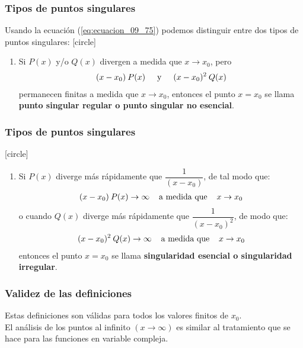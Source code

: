 \documentclass[12pt]{beamer}
\begin{document}
\begin{frame}
\frametitle{Tipos de puntos singulares}
Usando la ecuación (\ref{eq:ecuacion_09_75}) podemos distinguir entre dos tipos de puntos singulares:
\pause
{}
[circle]
\begin{enumerate}
\item Si $P(x)$ y/o $Q(x)$ divergen a medida que $x \to x_{0}$, pero
\begin{align*}
(x - x_{0}) \: P(x) \hspace{0.5cm} \mbox{y} \hspace{0.5cm} (x - x_{0})^{2} \: Q(x)
\end{align*}
permanecen finitas a medida que $x \to x_{0}$, \pause entonces el punto $x = x_{0}$ se llama \textbf{punto singular regular o punto singular no esencial}.
\seti
\end{enumerate}
\end{frame}
\begin{frame}
\frametitle{Tipos de puntos singulares}
[circle]
\begin{enumerate}
\conti 
\item Si $P(x)$ diverge más rápidamente que $\dfrac{1}{(x - x_{0})}$, de tal modo que:
\begin{align*}
(x - x_{0}) \: P(x) \to \infty \hspace{0.4cm} \mbox{a medida que} \hspace{0.4cm} x \to x_{0}
\end{align*}
\pause 
o cuando $Q(x)$ diverge más rápidamente que $\dfrac{1}{(x - x_{0})^{2}}$, de modo que:
\begin{align*}
(x - x_{0})^{2} \: Q(x) \to \infty \hspace{0.4cm} \mbox{a medida que} \hspace{0.4cm} x \to x_{0}
\end{align*}
\pause
entonces el punto $x = x_{0}$ se llama \textbf{singularidad esencial o singularidad irregular}.
\end{enumerate}
\end{frame}
\begin{frame}
\frametitle{Validez de las definiciones}
Estas definiciones son válidas para todos los valores finitos de $x_{0}$. 
\\
\bigskip
El análisis de los puntos al infinito $(x \to \infty)$ es similar al tratamiento que se hace para las funciones en variable compleja.
\end{frame}
\end{document}
